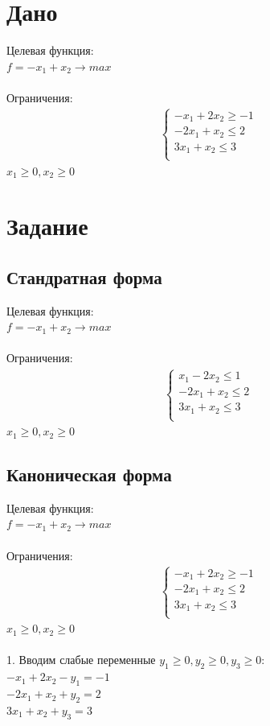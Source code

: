 \documentclass[14pt,a4paper,fleqn]{extarticle}
\begin{document}
\section*{Дано}
Целевая функция:\\
$f = -x_1+x_2 \longrightarrow max$\\\\
Ограничения:
\begin{align*}
	\begin{cases}
		-x_1 + 2x_2 \geq -1\\
		-2x_1 + x_2 \leq 2\\
		3x_1 + x_2 \leq 3\\
	\end{cases}
\end{align*}
$x_1 \geq 0, x_2 \geq 0$

\section*{Задание}
\subsection*{Стандратная форма}
Целевая функция:\\
$f = -x_1+x_2 \longrightarrow max$\\\\
Ограничения:
\begin{align*}
	\begin{cases}
		x_1 - 2x_2 \leq 1\\
		-2x_1 + x_2 \leq 2\\
		3x_1 + x_2 \leq 3\\
	\end{cases}
\end{align*}
$x_1 \geq 0, x_2 \geq 0$
\newpage
\subsection*{Каноническая форма}
Целевая функция:\\
$f = -x_1+x_2 \longrightarrow max$\\\\
Ограничения:
\begin{align*}
	\begin{cases}
		-x_1 + 2x_2 \geq -1\\
		-2x_1 + x_2 \leq 2\\
		3x_1 + x_2 \leq 3\\
	\end{cases}
\end{align*}
$x_1 \geq 0, x_2 \geq 0$\\\\
1. Вводим слабые переменные $y_1 \geq 0, y_2 \geq 0, y_3 \geq 0$:\\
$-x_1 + 2x_2 - y_1 = -1$\\
$-2x_1 + x_2 + y_2 = 2$\\
$3x_1 + x_2 + y_3 = 3$\\
\end{document}
